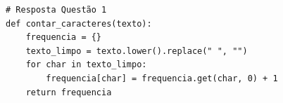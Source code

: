 \ifmostrarGabarito
\begin{verbatim}
# Resposta Questão 1
def contar_caracteres(texto):
    frequencia = {}
    texto_limpo = texto.lower().replace(" ", "")
    for char in texto_limpo:
        frequencia[char] = frequencia.get(char, 0) + 1
    return frequencia
\end{verbatim}
\fi
